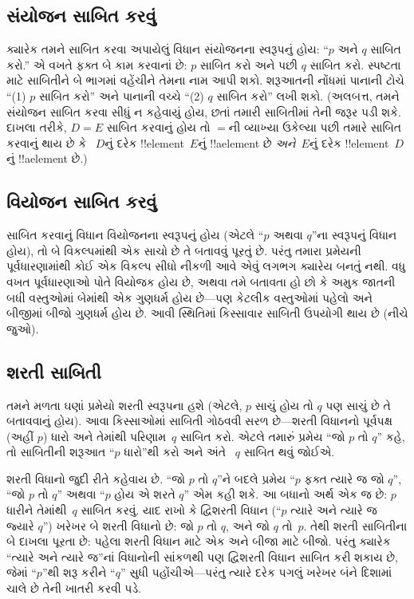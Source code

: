\documentclass[../../../include/open-logic-section]{subfiles}
\begin{document}
\subsection{સંયોજન સાબિત કરવું}

ક્યારેક તમને સાબિત કરવા અપાયેલું વિધાન સંયોજનના સ્વરૂપનું હોય:
``$p$ અને $q$ સાબિત કરો.'' એ વખતે ફક્ત બે કામ કરવાનાં છે:
$p$ સાબિત કરો અને પછી $q$ સાબિત કરો. સ્પષ્ટતા માટે સાબિતીને
બે ભાગમાં વહેંચીને તેમના નામ આપી શકો. શરૂઆતની નોંધમાં
પાનાની ટોચે ``(1) $p$ સાબિત કરો'' અને પાનાની વચ્ચે
``(2) $q$ સાબિત કરો'' લખી શકો. (અલબત્ત, તમને સંયોજન
સાબિત કરવા સીધું ન કહેવાયું હોય, છતાં તમારી સાબિતીમાં તેની
જરૂર પડી શકે. દાખલા તરીકે, $D = E$ સાબિત કરવાનું હોય તો
$=$ની વ્યાખ્યા ઉકેલ્યા પછી તમારે સાબિત કરવાનું થાય છે કે
~$D$નું દરેક !!{element}~$E$નું !!a{element} છે
\emph{અને}~$E$નું દરેક !!{element}~$D$નું !!a{element} છે.)

\subsection{વિયોજન સાબિત કરવું}

સાબિત કરવાનું વિધાન વિયોજનના સ્વરૂપનું હોય (એટલે ``$p$ અથવા
$q$''ના સ્વરૂપનું વિધાન હોય), તો બે વિકલ્પમાંથી એક સાચો છે તે
બતાવવું પૂરતું છે. પરંતુ તમારા પ્રમેયની પૂર્વધારણામાંથી કોઈ એક
વિકલ્પ સીધો નીકળી આવે એવું લગભગ ક્યારેય બનતું નથી. વધુ વખત
પૂર્વધારણાઓ પોતે વિયોજક હોય છે, અથવા તમે બતાવતા હો છો કે અમુક
જાતની બધી વસ્તુઓમાં બેમાંથી એક ગુણધર્મ હોય છે---પણ કેટલીક
વસ્તુઓમાં પહેલો અને બીજીમાં બીજો ગુણધર્મ હોય છે. આવી સ્થિતિમાં
કિસ્સાવાર સાબિતી ઉપયોગી થાય છે (નીચે જુઓ).

\subsection{શરતી સાબિતી}

તમને મળતા ઘણાં પ્રમેયો શરતી સ્વરૂપના હશે (એટલે, $p$ સાચું હોય
તો $q$ પણ સાચું છે તે બતાવવાનું હોય). આવા કિસ્સાઓમાં સાબિતી
ગોઠવવી સરળ છે---શરતી વિધાનનો પૂર્વપક્ષ (અહીં $p$) ધારો અને
તેમાંથી પરિણામ~$q$ સાબિત કરો. એટલે તમારું પ્રમેય ``જો $p$ તો
$q$'' કહે, તો સાબિતીની શરૂઆત ``$p$ ધારો''થી કરો અને અંતે
~$q$ સાબિત થવું જોઈએ.

શરતી વિધાનો જુદી રીતે કહેવાય છે. ``જો $p$ તો $q$''ને બદલે
પ્રમેય ``$p$ ફક્ત ત્યારે જ જો $q$'', ``જો $p$ તો $q$'' અથવા
``$p$ હોય એ શરતે $q$'' એમ કહી શકે. આ બધાનો અર્થ એક જ છે:
$p$ ધારીને તેમાંથી~$q$ સાબિત કરવું. યાદ રાખો કે દ્વિશરતી
વિધાન (``$p$ ત્યારે અને ત્યારે જ જ્યારે $q$'') ખરેખર બે
શરતી વિધાનો છે: જો $p$ તો $q$, અને જો $q$ તો~$p$. તેથી
શરતી સાબિતીના બે દાખલા પૂરતા છે: પહેલા શરતી વિધાન માટે એક
અને બીજા માટે બીજો. પરંતુ ક્યારેક ``ત્યારે અને ત્યારે જ''નાં
વિધાનોની સાંકળથી પણ દ્વિશરતી વિધાન સાબિત કરી શકાય છે, જેમાં
``$p$''થી શરૂ કરીને ``$q$'' સુધી પહોંચીએ---પરંતુ ત્યારે
દરેક પગલું ખરેખર બંને દિશામાં ચાલે છે તેની ખાતરી કરવી પડે.
\end{document}
